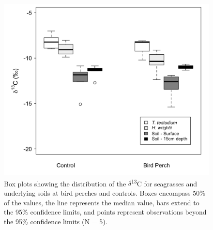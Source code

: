\begin{figure}
  \centering
  \includegraphics[width=.95\textwidth]{Figures/chapter1/fig10}
\caption[Box plots showing the distribution of the $\delta$\textsuperscript{13}C for seagrasses and underlying soils at bird perches and controls. Boxes encompass 50\% of the values, the line represents the median value, bars extend to the 95\% confidence limits, and points represent observations beyond the 95\% confidence limits (N = 5)]{Box plots showing the distribution of the $\delta$\textsuperscript{13}C for seagrasses and underlying soils at bird perches and controls. Boxes encompass 50\% of the values, the line represents the median value, bars extend to the 95\% confidence limits, and points represent observations beyond the 95\% confidence limits (N = 5). }
  \label{fig:1fig10}
\end{figure}
